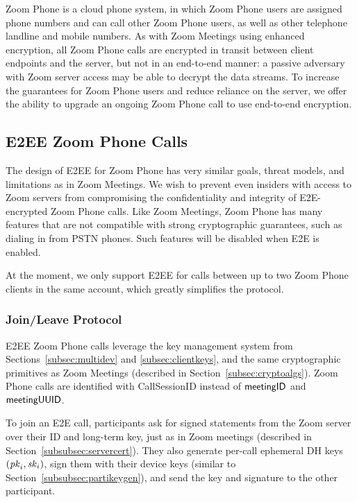 Zoom Phone is a cloud phone system, in which Zoom Phone users are assigned phone numbers and can
call other Zoom Phone users, as well as other telephone landline and mobile numbers. As with Zoom
Meetings using enhanced encryption, all Zoom Phone calls are encrypted in transit between client
endpoints and the server, but not in an end-to-end manner: a passive adversary with Zoom server
access may be able to decrypt the data streams. To increase the guarantees for Zoom Phone users and
reduce reliance on the server, we offer the ability to upgrade an ongoing Zoom Phone call to use
end-to-end encryption.

\subsection{E2EE Zoom Phone Calls}\label{subsec:phone}

The design of E2EE for Zoom Phone has very similar goals, threat models, and limitations as in Zoom
Meetings. We wish to prevent even insiders with access to Zoom servers from compromising the
confidentiality and integrity of E2E-encrypted Zoom Phone calls. Like Zoom Meetings, Zoom Phone has
many features that are not compatible with strong cryptographic guarantees, such as dialing in from
PSTN phones. Such features will be disabled when E2E is enabled.

At the moment, we only support E2EE for calls between up to two Zoom Phone clients in the same
account, which greatly simplifies the protocol.

\subsubsection{Join/Leave Protocol}

E2EE Zoom Phone calls leverage the key management system from Sections~\ref{subsec:multidev} and
\ref{subsec:clientkeys}, and the same cryptographic primitives as Zoom Meetings (described in
Section~\ref{subsec:cryptoalgs}). Zoom Phone calls are identified with {\sf CallSessionID} instead
of ${\sf meetingID}$ and ${\sf meetingUUID}$.

To join an E2E call, participants ask for signed statements from the Zoom server over their ID and
long-term key, just as in Zoom meetings (described in Section~\ref{subsubsec:servercert}). They also
generate per-call ephemeral DH keys $(\mathit{pk}_i, \mathit{sk}_i)$, sign them with their device keys (similar to
Section~\ref{subsubsec:partikeygen}), and send the key and signature to the other participant.

